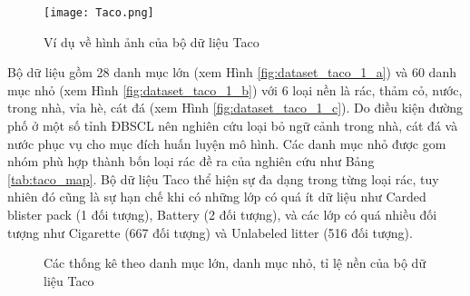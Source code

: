 \documentclass[../the.tex]{subfiles}
\begin{document}
\begin{figure}[H]
	\centering
	\texttt{[image: Taco.png]}
	\caption{Ví dụ về hình ảnh của bộ dữ liệu Taco \cite{proença2020taco}}
	\label{fig:dataset_taco}
\end{figure}
{\fontsize{13}{12} \selectfont

Bộ dữ liệu gồm 28 danh mục lớn  (xem Hình \ref{fig:dataset_taco_1_a}) và 60 danh mục nhỏ (xem Hình \ref{fig:dataset_taco_1_b}) với
6 loại nền là rác, thảm cỏ, nước, trong nhà, vỉa hè, cát đá (xem Hình \ref{fig:dataset_taco_1_c}). Do
điều kiện đường phố ở một số tỉnh ĐBSCL nên nghiên cứu loại bỏ ngữ cảnh trong nhà, cát đá và nước phục vụ cho mục đích huấn luyện mô hình. Các danh
mục nhỏ được gom nhóm phù hợp thành bốn loại rác đề ra của nghiên cứu như Bảng \ref{tab:taco_map}. Bộ dữ liệu Taco thể hiện sự đa dạng trong từng loại rác,
tuy nhiên đó cũng là sự hạn chế khi có những lớp có quá ít dữ liệu như Carded blister pack (1 đối tượng), Battery (2 đối tượng), và các lớp có quá nhiều đối tượng như Cigarette (667 đối tượng) và Unlabeled litter (516 đối tượng).

}

\begin{figure}[H]
	\centering
	\qquad
	\qquad
	\caption{Các thống kê theo danh mục lớn, danh mục nhỏ, tỉ lệ nền của bộ dữ liệu Taco}%
	\label{fig:dataset_taco_1}
\end{figure}
\end{document}
